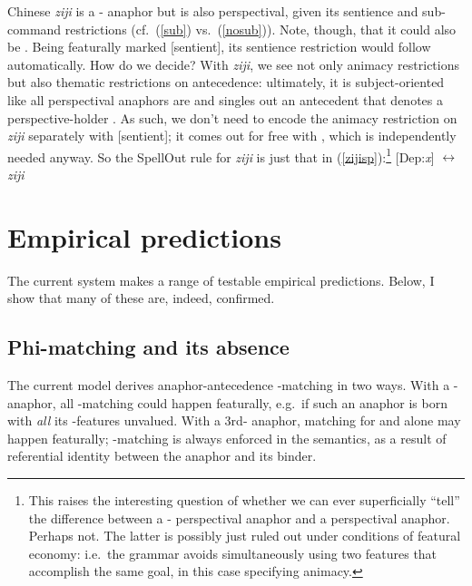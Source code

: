 \documentclass[output=paper, modfonts, nonflat]{langsci/langscibook}
\begin{document}
        Chinese \textit{ziji} is a \nul-\person{} anaphor but is also
        perspectival, given its sentience and sub-command restrictions
        (cf.\ (\ref{sub}) vs.\ (\ref{nosub})). Note, though, that it
        could also be . Being featurally marked [sentient], its
        sentience restriction would follow automatically. How do we
        decide?  With \textit{ziji}, we see not only animacy
        restrictions but also thematic restrictions on antecedence:
        ultimately, it is subject-oriented like all perspectival
        anaphors are and singles out an antecedent that denotes a
        perspective-holder \citep{huangliu:2001}.  As such, we don't
        need to encode the animacy restriction on \textit{ziji}
        separately with [sentient]; it comes out for free
        with \dep, which is independently needed anyway. So the
        SpellOut rule for \textit{ziji} is just that in
        (\ref{zijisp}):\footnote{This raises the interesting question
          of whether we can ever superficially ``tell'' the difference
          between a \nul-\person{} perspectival anaphor and a 
          perspectival anaphor. Perhaps not.  The latter is possibly
          just ruled out under conditions of featural economy: i.e.\
          the grammar avoids simultaneously using two features that
          accomplish the same goal, in this case specifying animacy.}
        \ea\label{zijisp} {[}Dep:\textit{x}] $\leftrightarrow$
        \textit{ziji} \z


\section{Empirical predictions}
    \label{secpred}

    The current system makes a range of testable empirical
    predictions. Below, I show that many of these are, indeed,
    confirmed.

\subsection{Phi-matching and its absence}
  \label{phiabs}


  The current model derives anaphor-antecedence \ph-matching in two
  ways. With a \nul-\person{} anaphor, all \ph-matching could happen
  featurally, e.g.\ if such an anaphor is born with \emph{all} its
  \ph-features unvalued. With a 3rd-\person{} anaphor, matching for
  \num{} and \gender{} alone may happen featurally; \person-matching
  is always enforced in the semantics, as a result of referential
  identity between the anaphor and its binder.
\end{document}
